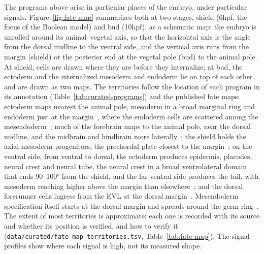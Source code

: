 \documentclass[11pt,a4paper]{article}
\begin{document}
The programs above arise in particular places of the embryo, under particular signals. Figure~\ref{fig:fate-map} summarizes both at two stages, shield (6hpf, the focus of the Boolean model) and bud (10hpf), as a schematic map: the embryo is unrolled around its animal--vegetal axis, so that the horizontal axis is the angle from the dorsal midline to the ventral side, and the vertical axis runs from the margin (shield) or the posterior end at the vegetal pole (bud) to the animal pole. At shield, cells are drawn where they are before they internalize; at bud, the ectoderm and the internalized mesoderm and endoderm lie on top of each other and are drawn as two maps. The territories follow the location of each program in its annotation (Table~\ref{tab:curated-programs}) and the published fate maps: ectoderm maps nearest the animal pole, mesoderm in a broad marginal ring and endoderm just at the margin~\cite{kimmel1990,kimmel1995}, where the endoderm cells are scattered among the mesendoderm~\cite{shah2019}; much of the forebrain maps to the animal pole, near the dorsal midline, and the midbrain and hindbrain more laterally~\cite{woo1995,kimmel1995}; the shield holds the axial mesoderm progenitors, the prechordal plate closest to the margin~\cite{shih1995,melby1996,kimmel1995}; on the ventral side, from ventral to dorsal, the ectoderm produces epidermis, placodes, neural crest and neural tube, the neural crest in a broad ventrolateral domain that ends 90--100$^\circ$ from the shield, and the far ventral side produces the tail, with mesoderm reaching higher above the margin than elsewhere~\cite{kushkowski2026}; and the dorsal forerunner cells ingress from the EVL at the dorsal margin~\cite{oteiza2008,warga2018}. Mesendoderm specification itself starts at the dorsal margin and spreads around the germ ring~\cite{shah2019}. The extent of most territories is approximate: each one is recorded with its source and whether its position is verified, and how to verify it (\nolinkurl{data/curated/fate_map_territories.tsv}, Table~\ref{tab:fate-map}). The signal profiles show where each signal is high, not its measured shape.
\end{document}
